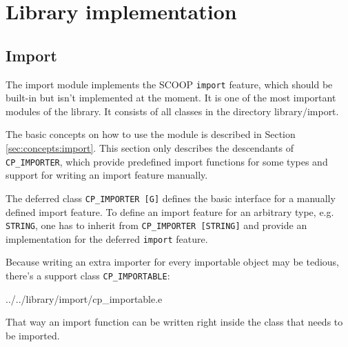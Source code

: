 \documentclass[a4paper,10pt]{article}
\newcommand{\dir} [1] [] {#1}
\begin{document}

\section{Library implementation}

\subsection{Import}
\label{sec:modules:import}

The import module implements the SCOOP \lstinline!import! feature, which should be built-in but isn't implemented at the moment.
It is one of the most important modules of the library.
It consists of all classes in the directory \dir{library/import}.

The basic concepts on how to use the module is described in Section \ref{sec:concepts:import}.
This section only describes the descendants of \lstinline!CP_IMPORTER!, which provide predefined import functions for some types and support for writing an import feature manually.

The deferred class \lstinline!CP_IMPORTER [G]! defines the basic interface for a manually defined import feature.
To define an import feature for an arbitrary type, e.g. \lstinline!STRING!, one has to inherit from \lstinline!CP_IMPORTER [STRING]! and provide an implementation for the deferred \lstinline!import! feature.

% 

Because writing an extra importer for every importable object may be tedious, there's a support class \lstinline!CP_IMPORTABLE!:

 {../../library/import/cp_importable.e}

That way an import function can be written right inside the class that needs to be imported.
\end{document}
